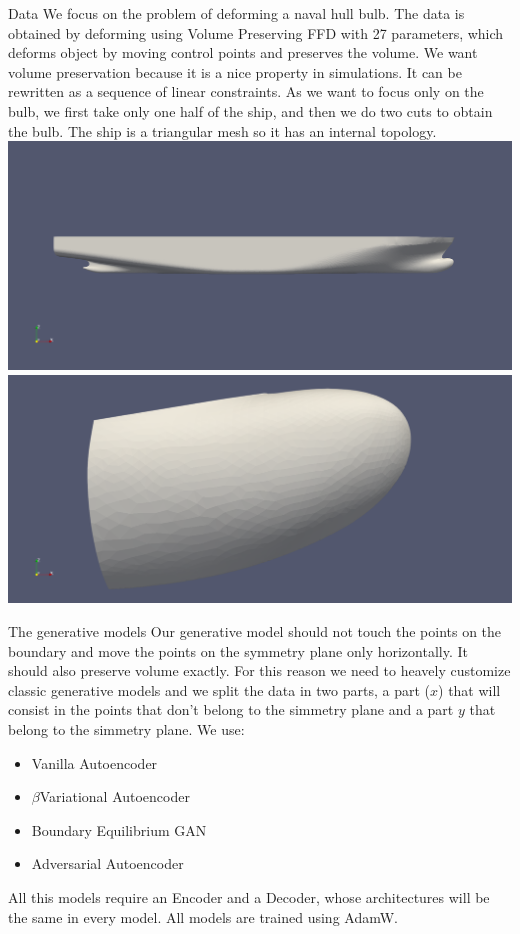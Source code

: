 \documentclass{beamer}
\begin{document}
\begin{frame}{Data}
We focus on the problem of deforming a naval hull bulb. The data is obtained by deforming using Volume Preserving FFD with 27 parameters, which deforms object by moving control points and preserves the volume. We want volume preservation because it is a nice property in simulations. It can be rewritten as a sequence of linear constraints. As we want to focus only on the bulb, we first take only one half of the ship, and then we do two cuts to obtain the bulb.  The ship is a triangular mesh so it has an internal topology.\\
\includegraphics[scale=0.08]{naval}
\includegraphics[scale=0.08]{bulbo}
\end{frame}
\begin{frame}{The generative models}
Our generative model should not touch the points on the boundary and move the points on the symmetry plane only horizontally. It should also preserve volume exactly. For this reason we need to heavely customize classic generative models and we split the data in two parts, a part ($x$) that will consist in the points that don't belong to the simmetry plane and a part $y$ that belong to the simmetry plane.
We use:
\begin{itemize}
\item Vanilla Autoencoder
\item $\beta$Variational Autoencoder
\item Boundary Equilibrium GAN
\item Adversarial Autoencoder
\end{itemize}
All this models require an Encoder and a Decoder, whose architectures will be the same in every model.
All models are trained using AdamW.
\end{frame}
\end{document}
